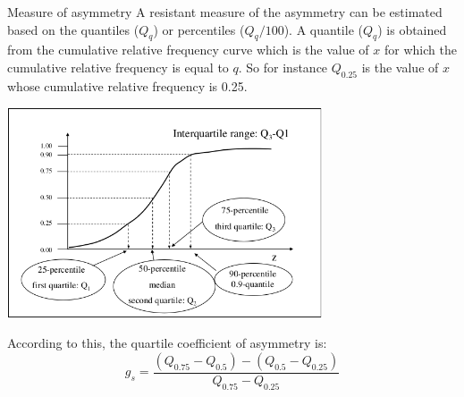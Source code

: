 \documentclass[8pt]{beamer}
\begin{document}
\begin{frame}{Measure of asymmetry}
    A resistant measure of the asymmetry can be estimated based on the quantiles ($Q_q$) or percentiles ($Q_q/100$). A quantile ($Q_q$) is obtained from the cumulative relative frequency curve which is the value of $x$ for which the cumulative relative frequency  is equal to $q$. So for instance $Q_{0.25}$ is the value of $x$ whose cumulative relative frequency is 0.25. 
        \vspace{-0.1cm}
    \begin{center}
        \includegraphics[width=0.7\textwidth]{fiBi29.png}
        \vspace{-0.3cm}
        \end{center}
According to this, the quartile coefficient of asymmetry is:
    $$
    g_s = \frac{\left(Q_{0.75} - Q_{0.5}\right) - \left( Q_{0.5} - Q_{0.25}\right)}{Q_{0.75}-Q_{0.25}}
    $$

\end{frame}
\end{document}
